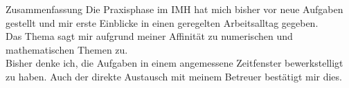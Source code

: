\documentclass{beamer}           %
\begin{document}
\begin{frame}{Zusammenfassung}
	Die Praxisphase im IMH hat mich bisher vor neue Aufgaben gestellt und mir erste Einblicke in einen geregelten Arbeitsalltag gegeben.\\
	\pause
	\vspace{2em}
	Das Thema sagt mir aufgrund meiner Affinität zu numerischen und mathematischen Themen zu.\\
	\pause
	\vspace{2em}
	Bisher denke ich, die Aufgaben in einem angemessene Zeitfenster bewerkstelligt zu haben. Auch der direkte Austausch mit meinem Betreuer bestätigt mir dies.
\end{frame}
\end{document}
